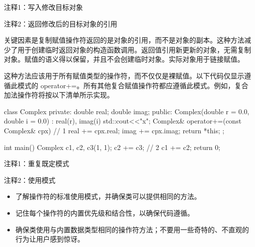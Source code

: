 {\footnotesize
注释1：写入修改目标对象

注释2：返回修改后的目标对象的引用
}

关键因素是复制赋值操作符返回的是对象的引用，而不是对象的副本。这种方法减少了用于创建临时返回对象的构造函数调用。返回值引用新更新的对象，无需复制对象。赋值的语义得以保留，并且不会创建临时对象。实际对象用于链接赋值。

这种方法应该用于所有赋值类型的操作符，而不仅仅是裸赋值。以下代码仅显示遵循此模式的 operator+=。所有其他复合赋值操作符都应遵循此模式。例如，复合加法操作符将按以下清单所示实现。


\begin{cpp}
class Complex {
private:
  double real;
  double imag;
public:
  Complex(double r = 0.0, double i = 0.0) :
  real(r), imag(i) {std::cout<<"x\n";}
  Complex& operator+=(const Complex& cpx) { // 1
    real += cpx.real;
    imag += cpx.imag;
    return *this;
  }
};

int main() {
  Complex c1, c2, c3(1, 1);
  c2 += c3; // 2
  c1 += c2;
  return 0;
}
\end{cpp}

{\footnotesize
注释1：重复既定模式

注释2：使用模式
}


\begin{itemize}
\item
了解操作符的标准使用模式，并确保类可以提供相同的方法。

\item
记住每个操作符的内置优先级和结合性，以确保代码遵循。

\item
确保类使用与内置数据类型相同的操作符方法；不要用一些奇特的、不直观的行为让用户感到惊讶。
\end{itemize}
